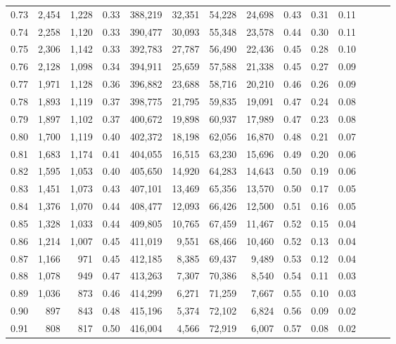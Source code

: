 \begin{tabular}{rrrrrrrrrrrrrr}
0.73 &  2,454 &  1,228 &  0.33 &  388,219 &   32,351 &  54,228 &  24,698 &  0.43 &  0.31 &      0.11 \\
0.74 &  2,258 &  1,120 &  0.33 &  390,477 &   30,093 &  55,348 &  23,578 &  0.44 &  0.30 &      0.11 \\
0.75 &  2,306 &  1,142 &  0.33 &  392,783 &   27,787 &  56,490 &  22,436 &  0.45 &  0.28 &      0.10 \\
0.76 &  2,128 &  1,098 &  0.34 &  394,911 &   25,659 &  57,588 &  21,338 &  0.45 &  0.27 &      0.09 \\
0.77 &  1,971 &  1,128 &  0.36 &  396,882 &   23,688 &  58,716 &  20,210 &  0.46 &  0.26 &      0.09 \\
0.78 &  1,893 &  1,119 &  0.37 &  398,775 &   21,795 &  59,835 &  19,091 &  0.47 &  0.24 &      0.08 \\
0.79 &  1,897 &  1,102 &  0.37 &  400,672 &   19,898 &  60,937 &  17,989 &  0.47 &  0.23 &      0.08 \\
0.80 &  1,700 &  1,119 &  0.40 &  402,372 &   18,198 &  62,056 &  16,870 &  0.48 &  0.21 &      0.07 \\
0.81 &  1,683 &  1,174 &  0.41 &  404,055 &   16,515 &  63,230 &  15,696 &  0.49 &  0.20 &      0.06 \\
0.82 &  1,595 &  1,053 &  0.40 &  405,650 &   14,920 &  64,283 &  14,643 &  0.50 &  0.19 &      0.06 \\
0.83 &  1,451 &  1,073 &  0.43 &  407,101 &   13,469 &  65,356 &  13,570 &  0.50 &  0.17 &      0.05 \\
0.84 &  1,376 &  1,070 &  0.44 &  408,477 &   12,093 &  66,426 &  12,500 &  0.51 &  0.16 &      0.05 \\
0.85 &  1,328 &  1,033 &  0.44 &  409,805 &   10,765 &  67,459 &  11,467 &  0.52 &  0.15 &      0.04 \\
0.86 &  1,214 &  1,007 &  0.45 &  411,019 &    9,551 &  68,466 &  10,460 &  0.52 &  0.13 &      0.04 \\
0.87 &  1,166 &    971 &  0.45 &  412,185 &    8,385 &  69,437 &   9,489 &  0.53 &  0.12 &      0.04 \\
0.88 &  1,078 &    949 &  0.47 &  413,263 &    7,307 &  70,386 &   8,540 &  0.54 &  0.11 &      0.03 \\
0.89 &  1,036 &    873 &  0.46 &  414,299 &    6,271 &  71,259 &   7,667 &  0.55 &  0.10 &      0.03 \\
0.90 &    897 &    843 &  0.48 &  415,196 &    5,374 &  72,102 &   6,824 &  0.56 &  0.09 &      0.02 \\
0.91 &    808 &    817 &  0.50 &  416,004 &    4,566 &  72,919 &   6,007 &  0.57 &  0.08 &      0.02 \\

\end{tabular}
